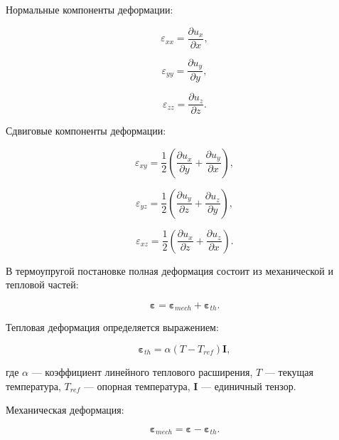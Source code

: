 Нормальные компоненты деформации:

\begin{equation}
\varepsilon_{xx}=\frac{\partial u_x}{\partial x},
\end{equation}

\begin{equation}
\varepsilon_{yy}=\frac{\partial u_y}{\partial y},
\end{equation}

\begin{equation}
\varepsilon_{zz}=\frac{\partial u_z}{\partial z}.
\end{equation}

Сдвиговые компоненты деформации:

\begin{equation}
\varepsilon_{xy}=\frac{1}{2}\left(\frac{\partial u_x}{\partial y}+\frac{\partial u_y}{\partial x}\right),
\end{equation}

\begin{equation}
\varepsilon_{yz}=\frac{1}{2}\left(\frac{\partial u_y}{\partial z}+\frac{\partial u_z}{\partial y}\right),
\end{equation}

\begin{equation}
\varepsilon_{xz}=\frac{1}{2}\left(\frac{\partial u_x}{\partial z}+\frac{\partial u_z}{\partial x}\right).
\end{equation}

В термоупругой постановке полная деформация состоит из механической и тепловой частей:

\begin{equation}
\boldsymbol{\varepsilon}=\boldsymbol{\varepsilon}_{mech}+\boldsymbol{\varepsilon}_{th}.
\end{equation}

Тепловая деформация определяется выражением:

\begin{equation}
\boldsymbol{\varepsilon}_{th}=\alpha(T-T_{ref})\mathbf{I},
\end{equation}

где $\alpha$ --- коэффициент линейного теплового расширения, $T$ --- текущая температура, $T_{ref}$ --- опорная температура, $\mathbf{I}$ --- единичный тензор.

Механическая деформация:

\begin{equation}
\boldsymbol{\varepsilon}_{mech}=\boldsymbol{\varepsilon}-\boldsymbol{\varepsilon}_{th}.
\end{equation}

